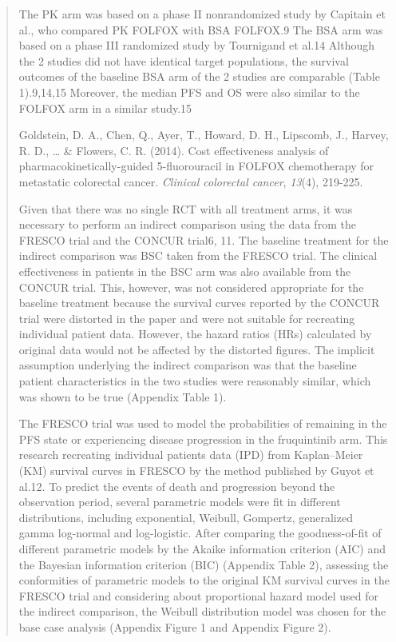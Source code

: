 \documentclass[
]{article}
\begin{document}
\begin{quote}
The PK arm was based on a phase II nonrandomized study by Capitain et
al., who compared PK FOLFOX with BSA FOLFOX.9 The BSA arm was based on a
phase III randomized study by Tournigand et al.14 Although the 2 studies
did not have identical target populations, the survival outcomes of the
baseline BSA arm of the 2 studies are comparable (Table 1).9,14,15
Moreover, the median PFS and OS were also similar to the FOLFOX arm in a
similar study.15

Goldstein, D. A., Chen, Q., Ayer, T., Howard, D. H., Lipscomb, J.,
Harvey, R. D., \ldots{} \& Flowers, C. R. (2014). Cost effectiveness
analysis of pharmacokinetically-guided 5-fluorouracil in FOLFOX
chemotherapy for metastatic colorectal cancer. \emph{Clinical colorectal
cancer}, \emph{13}(4), 219-225.

Given that there was no single RCT with all treatment arms, it was
necessary to perform an indirect comparison using the data from the
FRESCO trial and the CONCUR trial6, 11. The baseline treatment for the
indirect comparison was BSC taken from the FRESCO trial. The clinical
effectiveness in patients in the BSC arm was also available from the
CONCUR trial. This, however, was not considered appropriate for the
baseline treatment because the survival curves reported by the CONCUR
trial were distorted in the paper and were not suitable for recreating
individual patient data. However, the hazard ratios (HRs) calculated by
original data would not be affected by the distorted figures. The
implicit assumption underlying the indirect comparison was that the
baseline patient characteristics in the two studies were reasonably
similar, which was shown to be true (Appendix Table 1).

The FRESCO trial was used to model the probabilities of remaining in the
PFS state or experiencing disease progression in the fruquintinib arm.
This research recreating individual patients data (IPD) from
Kaplan--Meier (KM) survival curves in FRESCO by the method published by
Guyot et al.12. To predict the events of death and progression beyond
the observation period, several parametric models were fit in different
distributions, including exponential, Weibull, Gompertz, generalized
gamma log-normal and log-logistic. After comparing the goodness-of-fit
of different parametric models by the Akaike information criterion (AIC)
and the Bayesian information criterion (BIC) (Appendix Table 2),
assessing the conformities of parametric models to the original KM
survival curves in the FRESCO trial and considering about proportional
hazard model used for the indirect comparison, the Weibull distribution
model was chosen for the base case analysis (Appendix Figure 1 and
Appendix Figure 2).


\end{quote}
\end{document}
